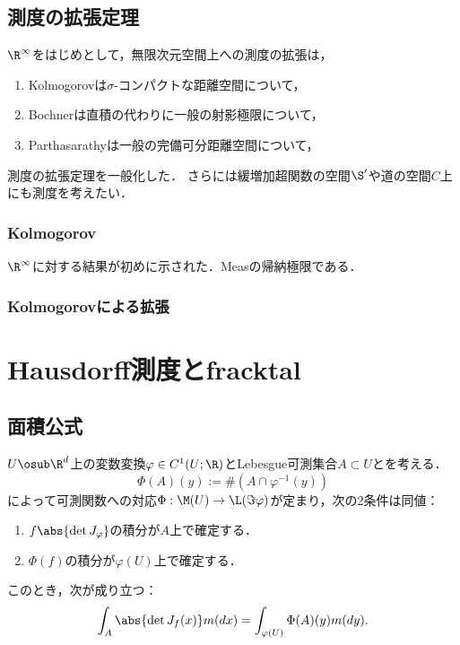 \documentclass[uplatex, dvipdfmx]{jsreport}
\begin{document}
\section{測度の拡張定理}

\begin{tcolorbox}[colframe=ForestGreen, colback=ForestGreen!10!white,breakable,colbacktitle=ForestGreen!40!white,coltitle=black,fonttitle=\bfseries\sffamily,
title=]
    $\R^\infty$をはじめとして，無限次元空間上への測度の拡張は，
    \begin{enumerate}
        \item Kolmogorovは$\sigma$-コンパクトな距離空間について，
        \item Bochnerは直積の代わりに一般の射影極限について，
        \item Parthasarathyは一般の完備可分距離空間について，
    \end{enumerate}
    測度の拡張定理を一般化した．
    さらには緩増加超関数の空間$\S'$や道の空間$C$上にも測度を考えたい．
\end{tcolorbox}

\subsection{Kolmogorov}

\begin{tcolorbox}[colframe=ForestGreen, colback=ForestGreen!10!white,breakable,colbacktitle=ForestGreen!40!white,coltitle=black,fonttitle=\bfseries\sffamily,
title=]
    $\R^\infty$に対する結果が初めに示された．Measの帰納極限である．
\end{tcolorbox}

\subsection{Kolmogorovによる拡張}

\chapter{Hausdorff測度とfracktal}

\section{面積公式}

\begin{theorem}
    $U\osub\R^d$上の変数変換$\varphi\in C^1(U;\R)$とLebesgue可測集合$A\subset U$とを考える．
    \[\Phi(A)(y):=\#(A\cap\varphi^{-1}(y))\]
    によって可測関数への対応$\Phi:\M(U)\to\L(\Im\varphi)$が定まり，次の2条件は同値：
    \begin{enumerate}
        \item $f\abs{\det J_\varphi}$の積分が$A$上で確定する．
        \item $\Phi(f)$の積分が$\varphi(U)$上で確定する．
    \end{enumerate}
    このとき，次が成り立つ：
    \[\int_A\abs{\det J_f(x)}m(dx)=\int_{\varphi(U)}\Phi(A)(y)m(dy).\]
\end{theorem}
\end{document}
